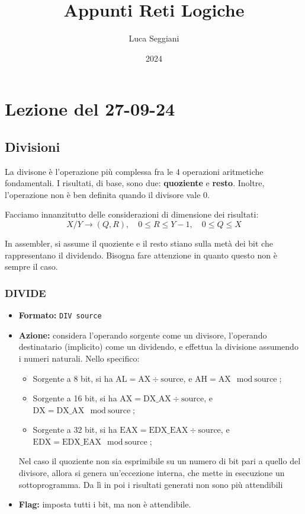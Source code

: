 \documentclass[a4paper,11pt]{article}
\title{Appunti Reti Logiche}
\author{Luca Seggiani}
\date{2024}
\begin{document}
\section{Lezione del 27-09-24}

\thispagestyle{empty}
\pagestyle{fancy}

\subsection{Divisioni}
La divisone è l'operazione più complessa fra le 4 operazioni aritmetiche fondamentali.
I risultati, di base, sono due: \textbf{quoziente} e \textbf{resto}.
Inoltre, l'operazione non è ben definita quando il divisore vale 0.

Facciamo innanzitutto delle considerazioni di dimensione dei risultati:
$$
X / Y \rightarrow (Q, R), \quad
0 \leq R \leq Y - 1, \quad
0 \leq Q \leq X
$$

In assembler, si assume il quoziente e il resto stiano sulla metà dei bit che rappresentano il dividendo.
Bisogna fare attenzione in quanto questo non è sempre il caso.

\subsubsection{DIVIDE}
\begin{itemize}
	\item \textbf{Formato:} \lstinline|DIV source|
	\item \textbf{Azione:} considera l'operando sorgente come un divisore, l'operando destinatario (implicito) come un dividendo, e effettua la divisione assumendo i numeri naturali. Nello specifico:
	\begin{itemize}
	\item Sorgente a 8 bit, si ha $\text{AL} = \text{AX} \div \text{source}$, e $ \text{AH} = \text{AX} \mod \text{source} $;
	\item Sorgente a 16 bit, si ha $\text{AX} = \text{DX\_AX} \div \text{source}$, e $ \text{DX} = \text{DX\_AX} \mod \text{source} $;
	\item Sorgente a 32 bit, si ha $\text{EAX} = \text{EDX\_EAX} \div \text{source}$, e $ \text{EDX} = \text{EDX\_EAX} \mod \text{source} $;
	\end{itemize}
		Nel caso il quoziente non sia esprimibile su un numero di bit pari a quello del divisore, allora si genera un'eccezione interna, che mette in esecuzione un sottoprogramma.
		Da lì in poi i risultati generati non sono più attendibili
	\item \textbf{Flag:} imposta tutti i bit, ma non è attendibile. 
\end{itemize}
\end{document}
